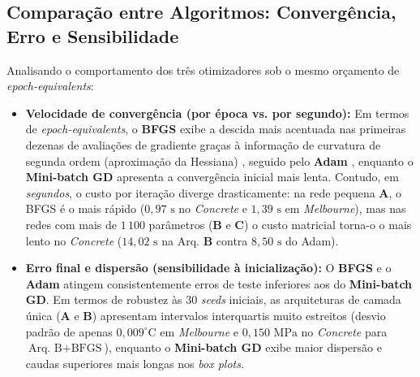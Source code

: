 \documentclass[conference]{IEEEtran}
\begin{document}
\subsection{Comparação entre Algoritmos: Convergência, Erro e Sensibilidade}
Analisando o comportamento dos três otimizadores sob o mesmo orçamento de \textit{epoch-equivalents}:
\begin{itemize}
    \item \textbf{Velocidade de convergência (por época vs. por segundo):} Em termos de \textit{epoch-equivalents}, o \textbf{BFGS} exibe a descida mais acentuada nas primeiras dezenas de avaliações de gradiente graças à informação de curvatura de segunda ordem (aproximação da Hessiana) \cite{b9}, seguido pelo \textbf{Adam} \cite{b5}, enquanto o \textbf{Mini-batch GD} apresenta a convergência inicial mais lenta. Contudo, em \textit{segundos}, o custo por iteração diverge drasticamente: na rede pequena \textbf{A}, o BFGS é o mais rápido ($0{,}97\text{ s}$ no \textit{Concrete} e $1{,}39\text{ s}$ em \textit{Melbourne}), mas nas redes com mais de $1\,100$ parâmetros (\textbf{B} e \textbf{C}) o custo matricial torna-o o mais lento no \textit{Concrete} ($14{,}02\text{ s}$ na Arq. \textbf{B} contra $8{,}50\text{ s}$ do Adam).
    \item \textbf{Erro final e dispersão (sensibilidade à inicialização):} O \textbf{BFGS} e o \textbf{Adam} atingem consistentemente erros de teste inferiores aos do \textbf{Mini-batch GD}. Em termos de robustez às $30$ \textit{seeds} iniciais, as arquiteturas de camada única (\textbf{A} e \textbf{B}) apresentam intervalos interquartis muito estreitos (desvio padrão de apenas $0{,}009^{\circ}\text{C}$ em \textit{Melbourne} e $0{,}150\text{ MPa}$ no \textit{Concrete} para $\text{Arq. B} + \text{BFGS}$), enquanto o \textbf{Mini-batch GD} exibe maior dispersão e caudas superiores mais longas nos \textit{box plots}.
\end{itemize}
\end{document}
